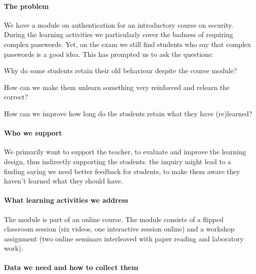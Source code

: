 
\paragraph{The problem}

We have a module on authentication for an introductory course on security.
During the learning activities we particularly cover the badness of requiring 
complex passwords.
Yet, on the exam we still find students who say that complex passwords is a 
good idea.
This has prompted us to ask the questions:
\begin{rqs}
\item%
  Why do some students retain their old behaviour despite the course module?

\item%
  How can we make them unlearn something very reinforced and relearn the 
  correct?

\item%
  How can we improve how long do the students retain what they have 
  (re)learned?
\end{rqs}

\paragraph{Who we support}

We primarily want to support the teacher, to evaluate and improve the learning 
design, thus indirectly supporting the students.
\Eg the inquiry might lead to a finding saying we need better feedback for 
students, to make them aware they haven't learned what they should have.

\paragraph{What learning activities we address}

The module is part of an online course.
The module consists of a flipped classroom session (six videos, one interactive 
session online) and a workshop assignment (two online seminars interleaved with 
paper reading and laboratory work).

\paragraph{Data we need and how to collect them}

